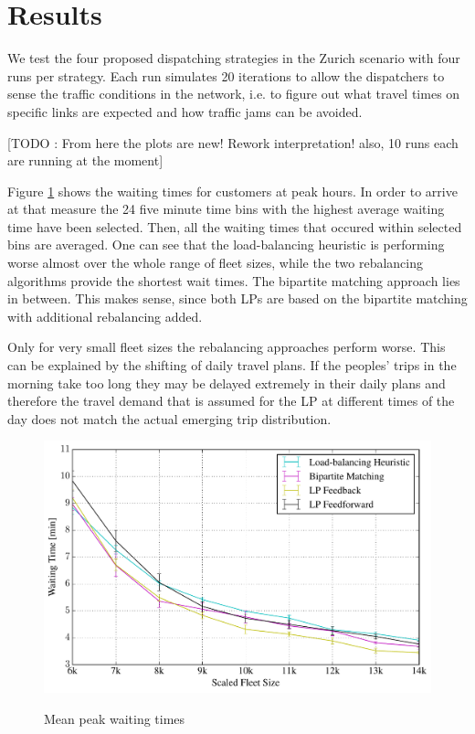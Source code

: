 \section{Results}
\label{sec:results}

We test the four proposed dispatching strategies in the Zurich scenario with four runs per strategy. Each run simulates 20 iterations to allow the dispatchers to sense the traffic conditions in the network, i.e. to figure out what travel times on specific links are expected and how traffic jams can be avoided.

[TODO : From here the plots are new! Rework interpretation! also, 10 runs each are running at the moment]

Figure \ref{fig:mean_peak_waiting_times} shows the waiting times for customers at peak hours. In order to arrive at that measure the 24 five minute time bins with the highest average waiting time have been selected. Then, all the waiting times that occured within selected bins are averaged. One can see that the load-balancing heuristic is performing worse almost over the whole range of fleet sizes, while the two rebalancing algorithms provide the shortest wait times. The bipartite matching approach lies in between. This makes sense, since both LPs are based on the bipartite matching with additional rebalancing added.

Only for very small fleet sizes the rebalancing approaches perform worse. This can be explained by the shifting of daily travel plans. If the peoples' trips in the morning take too long they may be delayed extremely in their daily plans and therefore the travel demand that is assumed for the LP at different times of the day does not match the actual emerging trip distribution.

\begin{figure}
\includegraphics[width=1.0\textwidth]{figures/mean_peak_waiting_times.pdf}
\label{fig:mean_peak_waiting_times}
\caption{Mean peak waiting times}
\end{figure}


